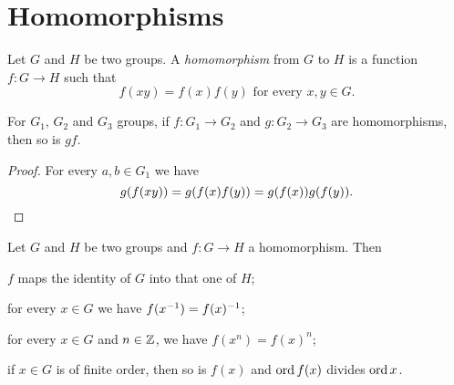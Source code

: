 
\section{Homomorphisms}

\begin{definition}[Homomorphisms]
Let \(G\) and \(H\) be two groups. A {\em homomorphism} from \(G\) to \(H\) is a function \(f : G \to H\) such that
\[f(xy) = f(x) f(y) \text{ for every } x, y \in G .\] 
\end{definition}

\begin{proposition}
For \(G_1\), \(G_2\) and \(G_3\) groups, if \(f : G_1 \to G_2\) and \(g : G_2 \to G_3\) are homomorphisms, then so is \(g f\).
\end{proposition}

\begin{proof}
For every \(a, b \in G_1\) we have
\[g(f(xy)) = g(f(x)f(y)) = g(f(x))g(f(y)).\qedhere\]
\end{proof}

\begin{proposition}\label{prop:HomProps}
Let \(G\) and \(H\) be two groups and \(f : G \to H\) a homomorphism. Then
\begin{tcbenum}
\item \(f\) maps the identity of \(G\) into that one of \(H\);
\item for every \(x \in G\) we have \(f(x^{-1}) = f(x)^{-1}\);
\item for every \(x \in G\) and \(n \in \mathbb Z\), we have \(f(x^n) = f(x)^n\);
\item if \(x \in G\) is of finite order, then so is \(f(x)\) and \(\operatorname{ord} f(x)\) divides \(\operatorname{ord} x\).
\end{tcbenum}
\end{proposition}


